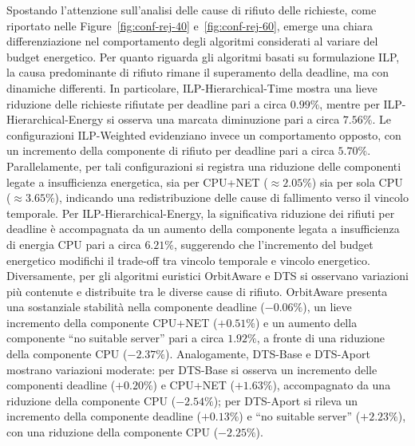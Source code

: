 \documentclass[12pt]{article}
\begin{document}
Spostando l’attenzione sull’analisi delle cause di rifiuto delle richieste, come riportato nelle Figure~\ref{fig:conf-rej-40} e~\ref{fig:conf-rej-60}, emerge una chiara differenziazione nel comportamento degli algoritmi considerati al variare del budget energetico. Per quanto riguarda gli algoritmi basati su formulazione ILP, la causa predominante di rifiuto rimane il superamento della deadline, ma con dinamiche differenti. In particolare, ILP-Hierarchical-Time mostra una lieve riduzione delle richieste rifiutate per deadline pari a circa $0.99\%$, mentre per ILP-Hierarchical-Energy si osserva una marcata diminuzione pari a circa $7.56\%$. Le configurazioni ILP-Weighted evidenziano invece un comportamento opposto, con un incremento della componente di rifiuto per deadline pari a circa $5.70\%$. Parallelamente, per tali configurazioni si registra una riduzione delle componenti legate a insufficienza energetica, sia per CPU+NET ($\approx 2.05\%$) sia per sola CPU ($\approx 3.65\%$), indicando una redistribuzione delle cause di fallimento verso il vincolo temporale. Per ILP-Hierarchical-Energy, la significativa riduzione dei rifiuti per deadline è accompagnata da un aumento della componente legata a insufficienza di energia CPU pari a circa $6.21\%$, suggerendo che l’incremento del budget energetico modifichi il trade-off tra vincolo temporale e vincolo energetico. Diversamente, per gli algoritmi euristici OrbitAware e DTS si osservano variazioni più contenute e distribuite tra le diverse cause di rifiuto. OrbitAware presenta una sostanziale stabilità nella componente deadline ($-0.06\%$), un lieve incremento della componente CPU+NET ($+0.51\%$) e un aumento della componente ``no suitable server'' pari a circa $1.92\%$, a fronte di una riduzione della componente CPU ($-2.37\%$). Analogamente, DTS-Base e DTS-Aport mostrano variazioni moderate: per DTS-Base si osserva un incremento delle componenti deadline ($+0.20\%$) e CPU+NET ($+1.63\%$), accompagnato da una riduzione della componente CPU ($-2.54\%$); per DTS-Aport si rileva un incremento della componente deadline ($+0.13\%$) e ``no suitable server'' ($+2.23\%$), con una riduzione della componente CPU ($-2.25\%$).
\end{document}

